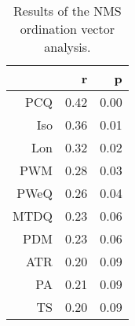 \begin{table}[ht]
\centering
\begin{tabular}{rrr}
  \hline
 & r & p \\ 
  \hline
PCQ & 0.42 & 0.00 \\ 
  Iso & 0.36 & 0.01 \\ 
  Lon & 0.32 & 0.02 \\ 
  PWM & 0.28 & 0.03 \\ 
  PWeQ & 0.26 & 0.04 \\ 
  MTDQ & 0.23 & 0.06 \\ 
  PDM & 0.23 & 0.06 \\ 
  ATR & 0.20 & 0.09 \\ 
  PA & 0.21 & 0.09 \\ 
  TS & 0.20 & 0.09 \\ 
   \hline
\end{tabular}
\caption{Results of the NMS ordination vector analysis.} 
\end{table}
